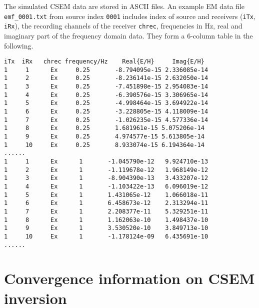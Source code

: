 \documentclass[a4paper,10pt]{article}
\begin{document}
The simulated CSEM data are stored in ASCII files. An example EM data file \verb|emf_0001.txt| from source index \texttt{0001} includes index of source and receivers (\texttt{iTx}, \texttt{iRx}), the recording channels of the receiver \texttt{chrec}, frequencies in Hz, real and imaginary part of the frequency domain data. They form a 6-column table in the following.
\begin{verbatim}
iTx  iRx   chrec frequency/Hz    Real{E/H}     Imag{E/H}
1     1      Ex     0.25       -8.794095e-15 2.336085e-14
1     2      Ex     0.25       -8.236141e-15 2.632050e-14
1     3      Ex     0.25       -7.451898e-15 2.954083e-14
1     4      Ex     0.25       -6.390576e-15 3.306965e-14
1     5      Ex     0.25       -4.998464e-15 3.694922e-14
1     6      Ex     0.25       -3.228805e-15 4.118009e-14
1     7      Ex     0.25       -1.026235e-15 4.577336e-14
1     8      Ex     0.25       1.681961e-15 5.075206e-14
1     9      Ex     0.25       4.974577e-15 5.613805e-14
1     10     Ex     0.25       8.933074e-15 6.194364e-14
......
1     1      Ex      1   	 -1.045790e-12 	 9.924710e-13
1     2      Ex      1   	 -1.119678e-12 	 1.968149e-12
1     3      Ex      1   	 -8.904390e-13 	 3.433207e-12
1     4      Ex      1   	 -1.103422e-13 	 6.096019e-12
1     5      Ex      1   	 1.431065e-12 	 1.066018e-11
1     6      Ex      1   	 6.458673e-12 	 2.313294e-11
1     7      Ex      1   	 2.208377e-11 	 5.329251e-11
1     8      Ex      1   	 1.162063e-10 	 1.498437e-10
1     9      Ex      1   	 3.530520e-10 	 3.849713e-10
1     10     Ex      1   	 -1.178124e-09 	 6.435691e-10
......
\end{verbatim}


\section{Convergence information on CSEM inversion}
\end{document}
